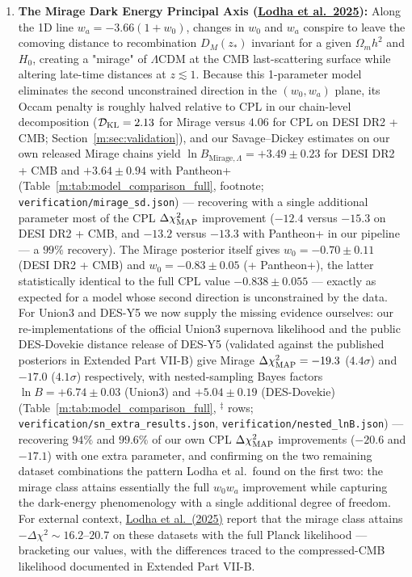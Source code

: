 \documentclass[aps,prd,preprint,superscriptaddress,nofootinbib]{revtex4-2}
\begin{document}
\begin{enumerate}
    \item \textbf{The Mirage Dark Energy Principal Axis (\href{https://arxiv.org/abs/2503.14743}{Lodha et al.\ 2025}):} Along the 1D line $w_a = -3.66(1 + w_0)$, changes in $w_0$ and $w_a$ conspire to leave the comoving distance to recombination $D_M(z_*)$ invariant for a given $\Omega_m h^2$ and $H_0$, creating a "mirage" of $\Lambda$CDM at the CMB last-scattering surface while altering late-time distances at $z \lesssim 1$. Because this 1-parameter model eliminates the second unconstrained direction in the $(w_0, w_a)$ plane, its Occam penalty is roughly halved relative to CPL in our chain-level decomposition ($\mathcal{D}_{\rm KL} = 2.13$ for Mirage versus $4.06$ for CPL on DESI DR2 + CMB; Section~\ref{m:sec:validation}), and our Savage--Dickey estimates on our own released Mirage chains yield $\ln B_{\text{Mirage},\Lambda} = +3.49 \pm 0.23$ for DESI DR2 + CMB and $+3.64 \pm 0.94$ with Pantheon+ (Table~\ref{m:tab:model_comparison_full}, footnote; \texttt{verification/mirage\_sd.json}) --- recovering with a single additional parameter most of the CPL $\Delta\chi^2_{\rm MAP}$ improvement ($-12.4$ versus $-15.3$ on DESI DR2 + CMB, and $-13.2$ versus $-13.3$ with Pantheon+ in our pipeline --- a $99\%$ recovery). The Mirage posterior itself gives $w_0 = -0.70 \pm 0.11$ (DESI DR2 + CMB) and $w_0 = -0.83 \pm 0.05$ (+ Pantheon+), the latter statistically identical to the full CPL value $-0.838 \pm 0.055$ --- exactly as expected for a model whose second direction is unconstrained by the data. For Union3 and DES-Y5 we now supply the missing evidence ourselves: our re-implementations of the official Union3 supernova likelihood and the public DES-Dovekie distance release of DES-Y5 (validated against the published posteriors in Extended Part VII-B) give Mirage $\Delta\chi^2_{\rm MAP} = -19.3$ ($4.4\sigma$) and $-17.0$ ($4.1\sigma$) respectively, with nested-sampling Bayes factors $\ln B = +6.74 \pm 0.03$ (Union3) and $+5.04 \pm 0.19$ (DES-Dovekie) (Table~\ref{m:tab:model_comparison_full}, $^{\ddagger}$ rows; \texttt{verification/sn\_extra\_results.json}, \texttt{verification/nested\_lnB.json}) --- recovering $94\%$ and $99.6\%$ of our own CPL $\Delta\chi^2_{\rm MAP}$ improvements ($-20.6$ and $-17.1$) with one extra parameter, and confirming on the two remaining dataset combinations the pattern Lodha et al.\ found on the first two: the mirage class attains essentially the full $w_0w_a$ improvement while capturing the dark-energy phenomenology with a single additional degree of freedom. For external context, \href{https://arxiv.org/abs/2503.14743}{Lodha et al.\ (2025)} report that the mirage class attains $-\Delta\chi^2 \sim 16.2\text{--}20.7$ on these datasets with the full Planck likelihood --- bracketing our values, with the differences traced to the compressed-CMB likelihood documented in Extended Part VII-B.

\end{enumerate}
\end{document}
